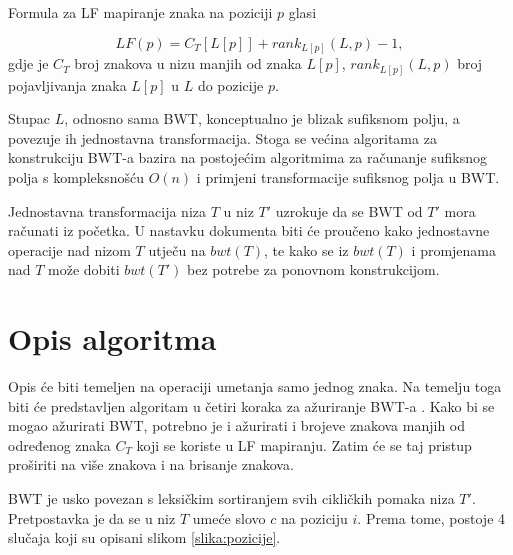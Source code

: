 \documentclass{ferseminar}
\begin{document}
Formula za LF mapiranje znaka na poziciji $p$ glasi

\begin{equation}
	LF(p)=C_T[L[p]]+rank_{L[p]}(L,p)-1 ,
\end{equation}
gdje je $C_T$ broj znakova u nizu manjih od znaka $L[p]$, $rank_{L[p]}(L,p)$ broj pojavljivanja znaka $L[p]$ u $L$ do pozicije $p$.

Stupac $L$, odnosno sama BWT, konceptualno je blizak sufiksnom polju, a povezuje ih jednostavna transformacija. Stoga se većina algoritama za konstrukciju BWT-a bazira na postojećim algoritmima za računanje sufiksnog polja s kompleksnošću $O(n)$ i primjeni transformacije sufiksnog polja u BWT.

Jednostavna transformacija niza $T$ u niz $T'$ uzrokuje da se BWT od $T'$ mora računati iz početka. U nastavku dokumenta biti će proučeno kako jednostavne operacije nad nizom $T$ utječu na $bwt(T)$, te kako se iz $bwt(T)$ i promjenama nad $T$ može dobiti $bwt(T')$ bez potrebe za ponovnom konstrukcijom. 

\section{Opis algoritma}
Opis će biti temeljen na operaciji umetanja samo jednog znaka. Na temelju toga biti će predstavljen algoritam u četiri koraka za ažuriranje BWT-a \citep{salson2009four}. Kako bi se mogao ažurirati BWT, potrebno je i ažurirati i brojeve znakova manjih od određenog znaka $C_T$ koji se koriste u LF mapiranju. Zatim će se taj pristup proširiti na više znakova i na brisanje znakova.

BWT je usko povezan s leksičkim sortiranjem svih cikličkih pomaka niza $T'$. Pretpostavka je da se u niz $T$ umeće slovo $c$ na poziciju $i$. Prema tome, postoje 4 slučaja koji su opisani slikom \ref{slika:pozicije}. 
\end{document}
